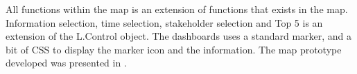 All functions within the map is an extension of functions that exists in the
map. Information selection, time selection, stakeholder selection and Top 5 is
an extension of the L.Control object. The dashboards uses a standard marker,
and a bit of CSS to display the marker icon and the information. The map
prototype developed was presented in .


